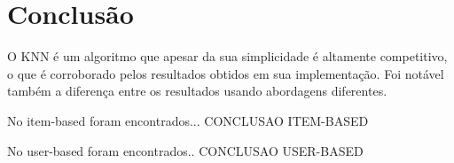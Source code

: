 \section{Conclusão}
O KNN é um algoritmo que apesar da sua simplicidade é altamente competitivo, o que é corroborado pelos resultados obtidos em sua implementação. Foi notável também a diferença entre os resultados usando abordagens diferentes.
\par
No item-based foram encontrados... CONCLUSAO ITEM-BASED
\par
No user-based foram encontrados.. CONCLUSAO USER-BASED
\par
